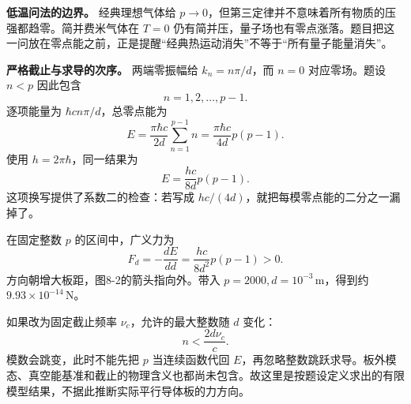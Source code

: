 \documentclass[12pt,a4paper,UTF8]{ctexart}
\begin{document}
\textbf{低温问法的边界。} 经典理想气体给
\(p\to0\)，但第三定律并不意味着所有物质的压强都趋零。简并费米气体在
\(T=0\)
仍有简并压，量子场也有零点涨落。题目把这一问放在零点能之前，正是提醒``经典热运动消失''不等于``所有量子能量消失''。

\textbf{严格截止与求导的次序。} 两端零振幅给 \(k_n=n\pi/d\)，而 \(n=0\)
对应零场。题设 \(n<p\) 因此包含 \[
n=1,2,\ldots,p-1.
\] 逐项能量为 \(\hbar cn\pi/d\)，总零点能为 \[
E=\frac{\pi\hbar c}{2d}\sum_{n=1}^{p-1}n
=\frac{\pi\hbar c}{4d}p(p-1).
\] 使用 \(h=2\pi\hbar\)，同一结果为 \[
E=\frac{hc}{8d}p(p-1).
\] 这项换写提供了系数二的检查：若写成
\(hc/(4d)\)，就把每模零点能的二分之一漏掉了。

在固定整数 \(p\) 的区间中，广义力为 \[
F_d=-\frac{dE}{dd}=\frac{hc}{8d^2}p(p-1)>0.
\] 方向朝增大板距，图8-2的箭头指向外。带入
\(p=2000,d=10^{-3}\,\mathrm m\)，得到约
\(9.93\times10^{-14}\,\mathrm N\)。

如果改为固定截止频率 \(\nu_c\)，允许的最大整数随 \(d\) 变化： \[
n<\frac{2d\nu_c}{c}.
\] 模数会跳变，此时不能先把 \(p\) 当连续函数代回
\(E\)，再忽略整数跳跃求导。板外模态、真空能基准和截止的物理含义也都尚未包含。故这里是按题设定义求出的有限模型结果，不据此推断实际平行导体板的力方向。
\end{document}
